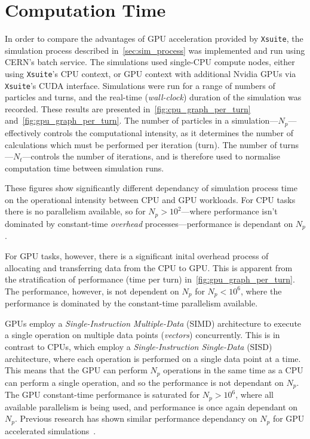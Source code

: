 \documentclass[11pt]{report}
\begin{document}
\section{Computation Time}

In order to compare the advantages of GPU acceleration provided by \verb|Xsuite|, the simulation process described in~\autoref{sec:sim_process} was implemented and run using CERN's batch service. The simulations used single-CPU compute nodes, either using \verb|Xsuite|'s CPU context, or GPU context with additional Nvidia GPUs via \verb|Xsuite|'s CUDA interface. Simulations were run for a range of numbers of particles and turns, and the real-time (\textit{wall-clock}) duration of the simulation was recorded. These results are presented in~\autoref{fig:cpu_graph_per_turn} and~\autoref{fig:gpu_graph_per_turn}. The number of particles in a simulation---$N_p$---effectively controls the computational intensity, as it determines the number of calculations which must be performed per iteration (turn). The number of turns---$N_t$---controls the number of iterations, and is therefore used to normalise computation time between simulation runs.

These figures show significantly different dependancy of simulation process time on the operational intensity between CPU and GPU workloads. For CPU tasks there is no parallelism available, so for $N_p>10^2$---where performance isn't dominated by constant-time \textit{overhead} processes---performance is dependant on $N_p$.

For GPU tasks, however, there is a significant inital overhead process of allocating and transferring data from the CPU to GPU. This is apparent from the stratification of performance (time per turn) in~\autoref{fig:gpu_graph_per_turn}. The performance, however, is not dependent on $N_p$ for $N_p<10^6$, where the performance is dominated by the constant-time parallelism available.

GPUs employ a \textit{Single-Instruction Multiple-Data} (SIMD) architecture to execute a single operation on multiple data points (\textit{vectors}) concurrently. This is in contrast to CPUs, which employ a \textit{Single-Instruction Single-Data} (SISD) architecture, where each operation is performed on a single data point at a time. This means that the GPU can perform $N_p$ operations in the same time as a CPU can perform a single operation, and so the performance is not dependant on $N_p$. The GPU constant-time performance is saturated for $N_p>10^6$, where all available parallelism is being used, and performance is once again dependant on $N_p$. Previous research has shown similar performance dependancy on $N_p$ for GPU accelerated simulations~\cite{Hegglin:2239398}.
\end{document}
